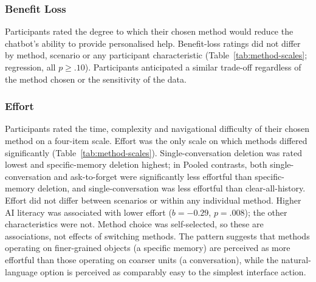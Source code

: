 \documentclass[conference,compsoc]{IEEEtran}
\begin{document}
\subsubsection{Benefit Loss}

Participants rated the degree to which their chosen method would reduce the chatbot's ability to provide personalised help. Benefit-loss ratings did not differ by method, scenario or any participant characteristic (Table~\ref{tab:method-scales}; regression, all $p\geq.10$). Participants anticipated a similar trade-off regardless of the method chosen or the sensitivity of the data.

\subsubsection{Effort}
\label{sec:effort}

Participants rated the time, complexity and navigational difficulty of their chosen method on a four-item scale. Effort was the only scale on which methods differed significantly (Table~\ref{tab:method-scales}). Single-conversation deletion was rated lowest and specific-memory deletion highest; in Pooled contrasts, both single-conversation and ask-to-forget were significantly less effortful than specific-memory deletion, and single-conversation was less effortful than clear-all-history. Effort did not differ between scenarios or within any individual method. Higher AI literacy was associated with lower effort ($b=-0.29$, $p=.008$); the other characteristics were not. Method choice was self-selected, so these are associations, not effects of switching methods. The pattern suggests that methods operating on finer-grained objects (a specific memory) are perceived as more effortful than those operating on coarser units (a conversation), while the natural-language option is perceived as comparably easy to the simplest interface action.
\end{document}
